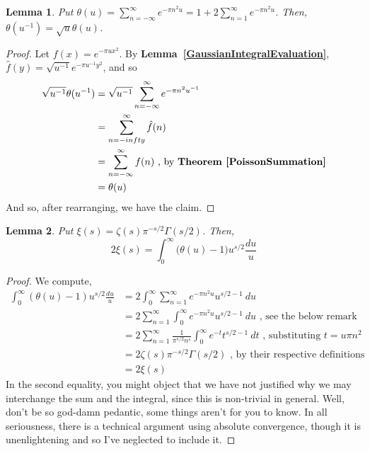 \documentclass[12pt]{article}
\newcommand{\lref}[1]{\textbf{Lemma~\ref{#1}}}
\newcommand{\tref}[1]{\textbf{Theorem~\ref{#1}}}
\newtheorem{lemma}{Lemma}
\numberwithin{equation}{section}
\numberwithin{thm}{section}
\numberwithin{lemma}{section}
\numberwithin{cor}{section}
\begin{document}
\begin{lemma}\label{ThetaFunctionalEquation}
  Put $\theta(u) = \sum_{n = - \infty}^{\infty} e^{-\pi n^2 u} = 1 + 2 \sum_{n = 1}^{\infty} e^{-\pi n^2 u}$. Then, $\theta(u^{-1}) = \sqrt{u} \theta(u)$.
\end{lemma}
\begin{proof}
  Let $f(x) = e^{-\pi u x^2}$. By \lref{GaussianIntegralEvaluation}, $\hat{f}(y) = \sqrt{u^{-1}} e^{-\pi u^{-1}y^2}$, and so \begin{align*}
    \sqrt{u^{-1}} \theta(u^{-1}) &= \sqrt{u^{-1}} \sum_{n = - \infty}^{\infty} e^{-\pi n^2 u^{-1}} \\
    &= \sum_{n = -infty}^{\infty} \hat{f}(n) \\
    &= \sum_{n = -\infty}^{\infty} f(n) \text{ , by \tref{PoissonSummation}} \\
    &= \theta(u)
  \end{align*} And so, after rearranging, we have the claim.
\end{proof}

\begin{lemma}\label{XiInTermsOfTheta}
  Put $\xi(s) = \zeta(s) \pi^{-s/2}\Gamma(s/2)$. Then, \begin{equation*}
    2 \xi(s) = \int_0^{\infty} \big( \theta(u) - 1 \big)u^{s/2} \frac{du}{u}
  \end{equation*}
\end{lemma}
\begin{proof}
  We compute, \begin{align*}
    \int_0^{\infty} (\theta(u) - 1)u^{s/2} \frac{du}{u} &= 2 \int_0^{\infty} \sum_{n = 1}^{\infty} e^{-\pi n^2 u} u^{s/2 - 1} \ du \\
    &= 2 \sum_{n = 1}^{\infty} \int_0^{\infty} e^{-\pi n^2 u} u^{s/2 - 1} \ du \text{ , see the below remark} \\
    &= 2 \sum_{n = 1}^{\infty} \frac{1}{\pi^{s/2} n^s} \int_0^{\infty}e^{-t} t^{s/2 - 1} \ dt \text{ , substituting } t = u \pi n^2 \\
    &= 2 \zeta(s) \pi^{-s/2} \Gamma(s/2) \text{ , by their respective definitions} \\
    &= 2 \xi(s)
  \end{align*} In the second equality, you might object that we have not justified why we may interchange the sum and the integral, since this is non-trivial in general. Well, don't be so god-damn pedantic, some things aren't for you to know. In all seriousness, there is a technical argument using absolute convergence, though it is unenlightening and so I've neglected to include it. 
\end{proof}
\end{document}
